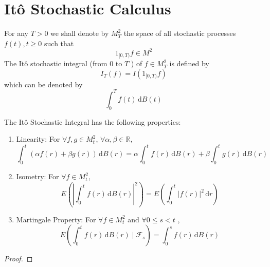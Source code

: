 \section{It\^o Stochastic Calculus}

\begin{definition}
	For any $T>0$ we shall denote by $M_{T}^{2}$ the space of all stochastic processes $f(t), t \geq 0$ such that
	\begin{equation*}
		1_{[0,T)}f\in M^{2}
	\end{equation*}
	The It\^o stochastic integral (from $0$ to $T$ ) of $f\in M_{T}^{2}$ is defined by
	\begin{equation}
		I_{T}(f)=I\left(1_{[0,T)}f\right)
	\end{equation}
	which can be denoted by
	\begin{equation}
		\int_{0}^{T}f(t)\,\mathrm{d}B(t)
	\end{equation}
\end{definition}

\begin{property}
	The It\^o Stochastic Integral has the following properties:
	\begin{enumerate}
		\item Linearity: For $\forall f,g\in M_{t}^{2}$, $\forall \alpha,\beta\in\mathbb{R}$,
		      \begin{equation}
			      \int_{0}^{t}(\alpha f(r)+\beta g(r))\,\mathrm{d}B(r)=\alpha \int_{0}^{t}f(r)\,\mathrm{d}B(r)+\beta\int_{0}^{t}g(r)\,\mathrm{d}B(r)
		      \end{equation}
		\item Isometry: For $\forall f\in M_{t}^{2}$,
		      \begin{equation}
			      E\left(\left|\int_{0}^{t}f(r)\,\mathrm{d}B(r)\right|^{2}\right)=E\left(\int_{0}^{t}|f(r)|^{2}\,\mathrm{d}r\right)
		      \end{equation}
		\item Martingale Property: For $\forall f\in M_{t}^{2}$ and  $\forall 0\leq s<t$ ,
		      \begin{equation}
			      E\left(\int_{0}^{t}f(r)\,\mathrm{d}B(r)\mid\mathcal{F}_{s}\right)=\int_{0}^{s}f(r)\,\mathrm{d}B(r)
		      \end{equation}
	\end{enumerate}
\end{property}

\begin{proof}

\end{proof}

